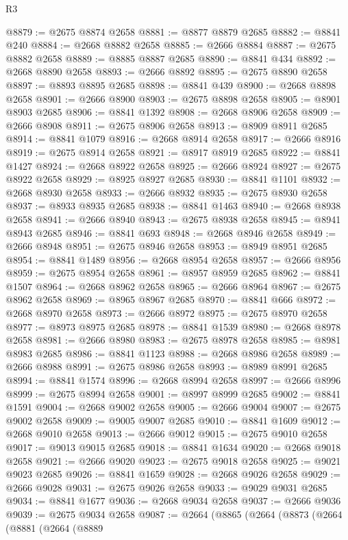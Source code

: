\begin{lexlean}{R3}
\begin{coremodule}
@8879 := @2675 @8874 @2658
@8881 := @8877 @8879 @2685
@8882 := @8841 @240
@8884 := @2668 @8882 @2658
@8885 := @2666 @8884
@8887 := @2675 @8882 @2658
@8889 := @8885 @8887 @2685
@8890 := @8841 @434
@8892 := @2668 @8890 @2658
@8893 := @2666 @8892
@8895 := @2675 @8890 @2658
@8897 := @8893 @8895 @2685
@8898 := @8841 @439
@8900 := @2668 @8898 @2658
@8901 := @2666 @8900
@8903 := @2675 @8898 @2658
@8905 := @8901 @8903 @2685
@8906 := @8841 @1392
@8908 := @2668 @8906 @2658
@8909 := @2666 @8908
@8911 := @2675 @8906 @2658
@8913 := @8909 @8911 @2685
@8914 := @8841 @1079
@8916 := @2668 @8914 @2658
@8917 := @2666 @8916
@8919 := @2675 @8914 @2658
@8921 := @8917 @8919 @2685
@8922 := @8841 @1427
@8924 := @2668 @8922 @2658
@8925 := @2666 @8924
@8927 := @2675 @8922 @2658
@8929 := @8925 @8927 @2685
@8930 := @8841 @1101
@8932 := @2668 @8930 @2658
@8933 := @2666 @8932
@8935 := @2675 @8930 @2658
@8937 := @8933 @8935 @2685
@8938 := @8841 @1463
@8940 := @2668 @8938 @2658
@8941 := @2666 @8940
@8943 := @2675 @8938 @2658
@8945 := @8941 @8943 @2685
@8946 := @8841 @693
@8948 := @2668 @8946 @2658
@8949 := @2666 @8948
@8951 := @2675 @8946 @2658
@8953 := @8949 @8951 @2685
@8954 := @8841 @1489
@8956 := @2668 @8954 @2658
@8957 := @2666 @8956
@8959 := @2675 @8954 @2658
@8961 := @8957 @8959 @2685
@8962 := @8841 @1507
@8964 := @2668 @8962 @2658
@8965 := @2666 @8964
@8967 := @2675 @8962 @2658
@8969 := @8965 @8967 @2685
@8970 := @8841 @666
@8972 := @2668 @8970 @2658
@8973 := @2666 @8972
@8975 := @2675 @8970 @2658
@8977 := @8973 @8975 @2685
@8978 := @8841 @1539
@8980 := @2668 @8978 @2658
@8981 := @2666 @8980
@8983 := @2675 @8978 @2658
@8985 := @8981 @8983 @2685
@8986 := @8841 @1123
@8988 := @2668 @8986 @2658
@8989 := @2666 @8988
@8991 := @2675 @8986 @2658
@8993 := @8989 @8991 @2685
@8994 := @8841 @1574
@8996 := @2668 @8994 @2658
@8997 := @2666 @8996
@8999 := @2675 @8994 @2658
@9001 := @8997 @8999 @2685
@9002 := @8841 @1591
@9004 := @2668 @9002 @2658
@9005 := @2666 @9004
@9007 := @2675 @9002 @2658
@9009 := @9005 @9007 @2685
@9010 := @8841 @1609
@9012 := @2668 @9010 @2658
@9013 := @2666 @9012
@9015 := @2675 @9010 @2658
@9017 := @9013 @9015 @2685
@9018 := @8841 @1634
@9020 := @2668 @9018 @2658
@9021 := @2666 @9020
@9023 := @2675 @9018 @2658
@9025 := @9021 @9023 @2685
@9026 := @8841 @1659
@9028 := @2668 @9026 @2658
@9029 := @2666 @9028
@9031 := @2675 @9026 @2658
@9033 := @9029 @9031 @2685
@9034 := @8841 @1677
@9036 := @2668 @9034 @2658
@9037 := @2666 @9036
@9039 := @2675 @9034 @2658
@9087 := @2664
    (@8865
      (@2664
        (@8873
          (@2664
            (@8881
              (@2664
                (@8889

\end{coremodule}
\end{lexlean}
